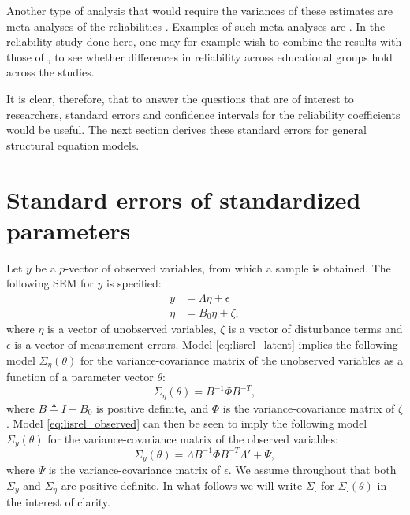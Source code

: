 \documentclass[a4paper, 11pt]{article}
\newcommand{\n}{\eta}
\newcommand{\definedas}{\triangleq}
\newcommand{\0}{\boldsymbol{0}}
\begin{document}
Another type of analysis that would require the variances of these estimates are meta-analyses of the reliabilities \citep[261, 271-2]{cooper2009handbook}. Examples of such meta-analyses are 
\cite{andrews_construct_1984,scherpenzeel_validity_1997,saris_estimation_2007,alwin_margins_2007}. In the reliability study done 
here, one may for example wish to combine the results with those of \cite{lundberg1996assessing}, to see whether differences in 
reliability across educational groups hold across the studies.

It is clear, therefore, that to answer the questions that are of interest to  researchers, standard errors and confidence intervals for the 
reliability coefficients would be useful. The next section derives these standard errors for general structural equation models. 

\section{Standard errors of standardized parameters}

Let $y$ be a $p$-vector of observed variables, from which a sample is obtained.
The following SEM for $y$ is specified:
\begin{align}
\label{eq:lisrel_observed}
y &= \Lambda \n + \epsilon\\
\n &= B_0 \n + \zeta,\label{eq:lisrel_latent}
\end{align}
where $\n$ is a vector of unobserved variables, $\zeta$ is a vector of
disturbance terms and $\epsilon$ is a vector of measurement errors. Model
\ref{eq:lisrel_latent} implies the following model
$\Sigma_\n(\theta)$ for the variance-covariance matrix of the unobserved
variables as a function of a parameter vector $\theta$: 
\begin{equation}\label{eq:sigma_n}
    \Sigma_\n(\theta) = B^{-1} \Phi B^{-T},
\end{equation}
where $B \definedas I - B_0$ is positive definite, 
and $\Phi$ is the variance-covariance
matrix of $\zeta$. Model \ref{eq:lisrel_observed} can then be seen to imply the
following model $\Sigma_y(\theta)$ for the variance-covariance matrix of the
observed variables:
\begin{equation}\label{eq:sigma_y}
    \Sigma_y(\theta) = \Lambda B^{-1} \Phi B^{-T} \Lambda' + \Psi,
\end{equation}
where  $\Psi$ is the variance-covariance matrix of $\epsilon$. 
We assume throughout that both $\Sigma_y$ and $\Sigma_\n$ are positive
definite. In what follows we will write $\Sigma_.$ for $\Sigma_.(\theta)$ in
the interest of clarity.
\end{document}
